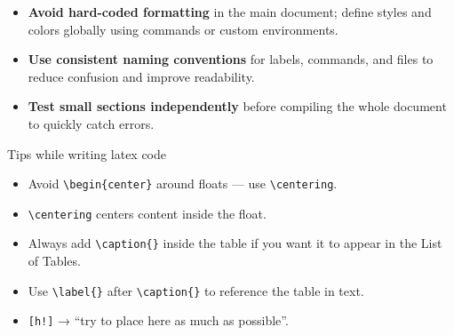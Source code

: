 \documentclass[../../main.tex]{subfiles}
\begin{document}
\begin{itemize}
    \item \textbf{Avoid hard-coded formatting} in the main document; define styles and colors globally using commands or custom environments.
    
    \item \textbf{Use consistent naming conventions} for labels, commands, and files to reduce confusion and improve readability.
    
    \item \textbf{Test small sections independently} before compiling the whole document to quickly catch errors.
\end{itemize}

Tips while writing latex code
\begin{itemize}
    \item Avoid \verb|\begin{center}| around floats — use \verb|\centering|.
    \item \verb|\centering| centers content inside the float.
    \item Always add \verb|\caption{}| inside the table if you want it to appear in the List of Tables.
    \item Use \verb|\label{}| after \verb|\caption{}| to reference the table in text.
    \item \verb|[h!]| → “try to place here as much as possible”.
\end{itemize}

\clearpage
\end{document}
